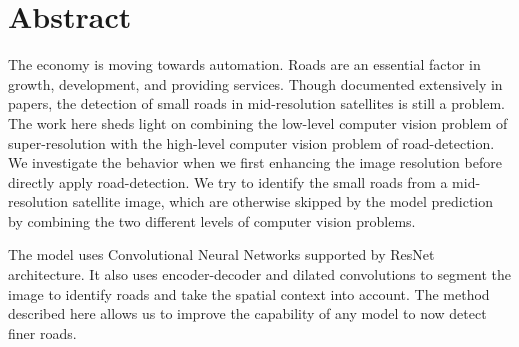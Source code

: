\chapter{Abstract}\label{tab:abstract}
The economy is moving towards automation. Roads are an essential factor in growth, development, and providing services. Though documented extensively in papers, the detection of small roads in mid-resolution satellites is still a problem. The work here sheds light on combining the low-level computer vision problem of super-resolution with the high-level computer vision problem of road-detection. We investigate the behavior when we first enhancing the image resolution before directly apply road-detection. We try to identify the small roads from a mid-resolution satellite image, which are otherwise skipped by the model prediction by combining the two different levels of computer vision problems.

The model uses Convolutional Neural Networks supported by ResNet architecture. It also uses encoder-decoder and dilated convolutions to segment the image to identify roads and take the spatial context into account. The method described here allows us to improve the capability of any model to now detect finer roads.